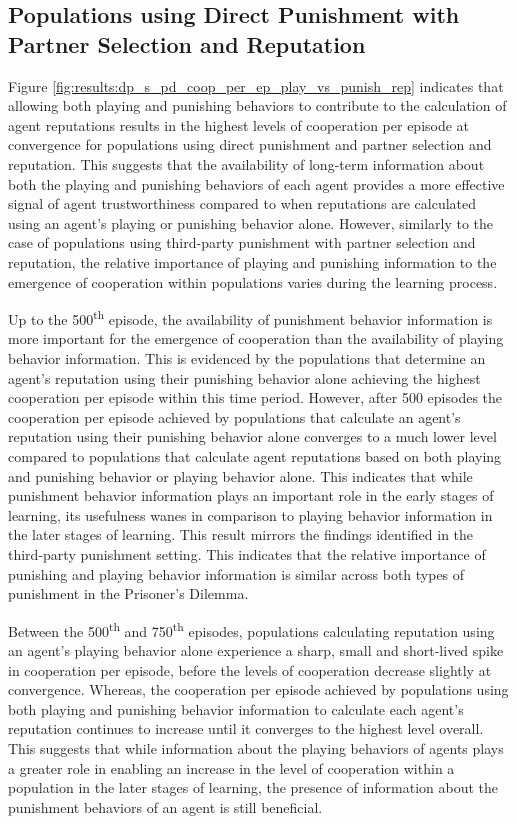 \documentclass[sn-aps,numbered]{sn-jnl}%
\theoremstyle{thmstyleone}%
\theoremstyle{thmstyletwo}%
\theoremstyle{thmstylethree}%
\begin{document}
\begin{appendices}
\clearpage
\subsection{Populations using Direct Punishment with Partner Selection and Reputation}

Figure \ref{fig:results:dp_s_pd_coop_per_ep_play_vs_punish_rep} indicates that allowing both playing and punishing behaviors to contribute to the calculation of agent reputations results in the highest levels of cooperation per episode at convergence for populations using direct punishment and partner selection and reputation. This suggests that the availability of long-term information about both the playing and punishing behaviors of each agent provides a more effective signal of agent trustworthiness compared to when reputations are calculated using an agent's playing or punishing behavior alone. However, similarly to the case of populations using third-party punishment with partner selection and reputation, the relative importance of playing and punishing information to the emergence of cooperation within populations varies during the learning process.

Up to the 500\textsuperscript{th} episode, the availability of punishment behavior information is more important for the emergence of cooperation than the availability of playing behavior information. This is evidenced by the populations that determine an agent's reputation using their punishing behavior alone achieving the highest cooperation per episode within this time period. However, after 500 episodes the cooperation per episode achieved by populations that calculate an agent's reputation using their punishing behavior alone converges to a much lower level compared to populations that calculate agent reputations based on both playing and punishing behavior or playing behavior alone. This indicates that while punishment behavior information plays an important role in the early stages of learning, its usefulness wanes in comparison to playing behavior information in the later stages of learning. This result mirrors the findings identified in the third-party punishment setting. This indicates that the relative importance of punishing and playing behavior information is similar across both types of punishment in the Prisoner's Dilemma. 

Between the 500\textsuperscript{th} and 750\textsuperscript{th} episodes, populations calculating reputation using an agent's playing behavior alone experience a sharp, small and short-lived spike in cooperation per episode, before the levels of cooperation decrease slightly at convergence. Whereas, the cooperation per episode achieved by populations using both playing and punishing behavior information to calculate each agent's reputation continues to increase until it converges to the highest level overall. This suggests that while information about the playing behaviors of agents plays a greater role in enabling an increase in the level of cooperation within a population in the later stages of learning, the presence of information about the punishment behaviors of an agent is still beneficial.


\end{appendices}
\end{document}
